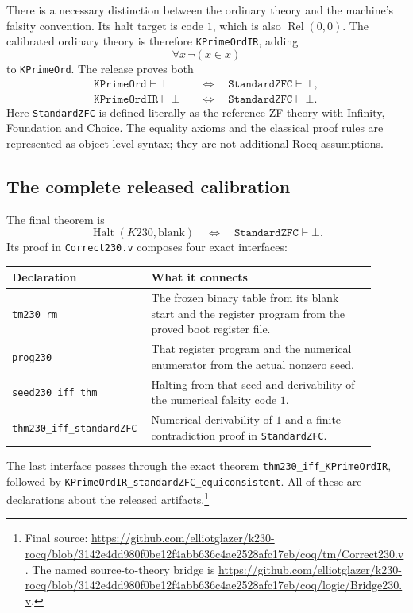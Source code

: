 There is a necessary distinction between the ordinary theory and the
machine's falsity convention.  Its halt target is code $1$, which is
also $\operatorname{Rel}(0,0)$.  The calibrated ordinary theory is
therefore \texttt{KPrimeOrdIR}, adding
\[
                       \forall x\,\neg(x\in x)
\]
to \texttt{KPrimeOrd}.  The release proves both
\begin{align*}
 \texttt{KPrimeOrd}\vdash\bot
     &\quad\Longleftrightarrow\quad \texttt{StandardZFC}\vdash\bot,\\
 \texttt{KPrimeOrdIR}\vdash\bot
     &\quad\Longleftrightarrow\quad \texttt{StandardZFC}\vdash\bot.
\end{align*}
Here \texttt{StandardZFC} is defined literally as the reference ZF
theory with Infinity, Foundation and Choice.  The equality axioms
and the classical proof rules are represented as object-level syntax;
they are not additional Rocq assumptions.

\subsection{The complete released calibration}

The final theorem is
\begin{equation}
 \operatorname{Halt}(K230,\text{blank})
       \quad\Longleftrightarrow\quad
       \texttt{StandardZFC}\vdash\bot.
 \label{eq:k230-final}
\end{equation}
Its proof in \texttt{Correct230.v} composes four exact interfaces:
\begin{center}
\begin{tabular}{p{0.31\linewidth}p{0.60\linewidth}}
\hline
Declaration & What it connects\\
\hline
\texttt{tm230\_rm} & The frozen binary table from its blank start and the
register program from the proved boot register file.\\
\texttt{prog230} & That register program and the numerical enumerator
from the actual nonzero seed.\\
\texttt{seed230\_iff\_thm} & Halting from that seed and derivability of
the numerical falsity code $1$.\\
\texttt{thm230\_iff\_standardZFC} & Numerical derivability of $1$ and a
finite contradiction proof in \texttt{StandardZFC}.\\
\hline
\end{tabular}
\end{center}
The last interface passes through the exact theorem
\texttt{thm230\_iff\_KPrimeOrdIR}, followed by
\texttt{KPrimeOrdIR\_standardZFC\_equiconsistent}.  All of these are
declarations about the released artifacts.\footnote{Final source:
\url{https://github.com/elliotglazer/k230-rocq/blob/3142e4dd980f0be12f4abb636c4ae2528afc17eb/coq/tm/Correct230.v}.
The named source-to-theory bridge is
\url{https://github.com/elliotglazer/k230-rocq/blob/3142e4dd980f0be12f4abb636c4ae2528afc17eb/coq/logic/Bridge230.v}.}

